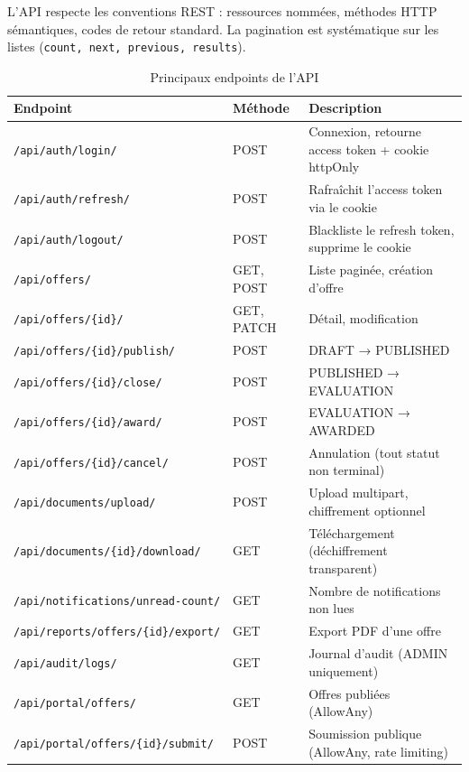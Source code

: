 L'API respecte les conventions REST : ressources nommées, méthodes HTTP sémantiques, codes de retour standard. La pagination est systématique sur les listes (\texttt{count, next, previous, results}).

\begin{table}[ht]
\centering
\caption{Principaux endpoints de l'API}
\label{tab:api}
\begin{tabularx}{\textwidth}{|l|l|X|}
\hline
\textbf{Endpoint} & \textbf{Méthode} & \textbf{Description} \\
\hline
\texttt{/api/auth/login/} & POST & Connexion, retourne access token + cookie httpOnly \\
\hline
\texttt{/api/auth/refresh/} & POST & Rafraîchit l'access token via le cookie \\
\hline
\texttt{/api/auth/logout/} & POST & Blackliste le refresh token, supprime le cookie \\
\hline
\texttt{/api/offers/} & GET, POST & Liste paginée, création d'offre \\
\hline
\texttt{/api/offers/\{id\}/} & GET, PATCH & Détail, modification \\
\hline
\texttt{/api/offers/\{id\}/publish/} & POST & DRAFT → PUBLISHED \\
\hline
\texttt{/api/offers/\{id\}/close/} & POST & PUBLISHED → EVALUATION \\
\hline
\texttt{/api/offers/\{id\}/award/} & POST & EVALUATION → AWARDED \\
\hline
\texttt{/api/offers/\{id\}/cancel/} & POST & Annulation (tout statut non terminal) \\
\hline
\texttt{/api/documents/upload/} & POST & Upload multipart, chiffrement optionnel \\
\hline
\texttt{/api/documents/\{id\}/download/} & GET & Téléchargement (déchiffrement transparent) \\
\hline
\texttt{/api/notifications/unread-count/} & GET & Nombre de notifications non lues \\
\hline
\texttt{/api/reports/offers/\{id\}/export/} & GET & Export PDF d'une offre \\
\hline
\texttt{/api/audit/logs/} & GET & Journal d'audit (ADMIN uniquement) \\
\hline
\texttt{/api/portal/offers/} & GET & Offres publiées (AllowAny) \\
\hline
\texttt{/api/portal/offers/\{id\}/submit/} & POST & Soumission publique (AllowAny, rate limiting) \\
\hline
\end{tabularx}
\end{table}

